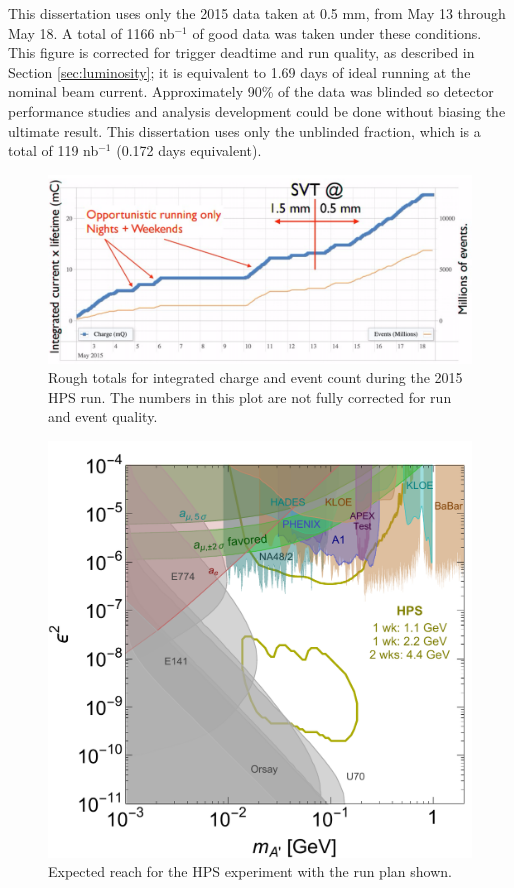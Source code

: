 This dissertation uses only the 2015 data taken at 0.5 mm, from May 13 through May 18.
A total of 1166 nb$^{-1}$ of good data was taken under these conditions.
This figure is corrected for trigger deadtime and run quality, as described in Section \ref{sec:luminosity}; it is equivalent to 1.69 days of ideal running at the nominal beam current.
Approximately 90\% of the data was blinded so detector performance studies and analysis development could be done without biasing the ultimate result.
This dissertation uses only the unblinded fraction, which is a total of 119 nb$^{-1}$ (0.172 days equivalent).

\begin{figure}[ht]
    \includegraphics[width=\textwidth]{intro/figs/engrun-beamtime}
    \caption{Rough totals for integrated charge and event count during the 2015 HPS run. The numbers in this plot are not fully corrected for run and event quality.}
    \label{fig:beamtime}
\end{figure}

\begin{figure}[ht]
    \includegraphics[width=\textwidth]{intro/figs/A-visible-HPS-official-6-2015}
    \caption{Expected reach for the HPS experiment with the run plan shown.}
    \label{fig:reach}
\end{figure}

